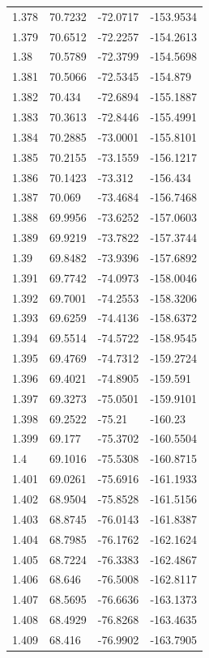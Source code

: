 \begin{tabular}{llll}
1.378 & 70.7232 & -72.0717 & -153.9534 \\
1.379 & 70.6512 & -72.2257 & -154.2613 \\
1.38 & 70.5789 & -72.3799 & -154.5698 \\
1.381 & 70.5066 & -72.5345 & -154.879 \\
1.382 & 70.434 & -72.6894 & -155.1887 \\
1.383 & 70.3613 & -72.8446 & -155.4991 \\
1.384 & 70.2885 & -73.0001 & -155.8101 \\
1.385 & 70.2155 & -73.1559 & -156.1217 \\
1.386 & 70.1423 & -73.312 & -156.434 \\
1.387 & 70.069 & -73.4684 & -156.7468 \\
1.388 & 69.9956 & -73.6252 & -157.0603 \\
1.389 & 69.9219 & -73.7822 & -157.3744 \\
1.39 & 69.8482 & -73.9396 & -157.6892 \\
1.391 & 69.7742 & -74.0973 & -158.0046 \\
1.392 & 69.7001 & -74.2553 & -158.3206 \\
1.393 & 69.6259 & -74.4136 & -158.6372 \\
1.394 & 69.5514 & -74.5722 & -158.9545 \\
1.395 & 69.4769 & -74.7312 & -159.2724 \\
1.396 & 69.4021 & -74.8905 & -159.591 \\
1.397 & 69.3273 & -75.0501 & -159.9101 \\
1.398 & 69.2522 & -75.21 & -160.23 \\
1.399 & 69.177 & -75.3702 & -160.5504 \\
1.4 & 69.1016 & -75.5308 & -160.8715 \\
1.401 & 69.0261 & -75.6916 & -161.1933 \\
1.402 & 68.9504 & -75.8528 & -161.5156 \\
1.403 & 68.8745 & -76.0143 & -161.8387 \\
1.404 & 68.7985 & -76.1762 & -162.1624 \\
1.405 & 68.7224 & -76.3383 & -162.4867 \\
1.406 & 68.646 & -76.5008 & -162.8117 \\
1.407 & 68.5695 & -76.6636 & -163.1373 \\
1.408 & 68.4929 & -76.8268 & -163.4635 \\
1.409 & 68.416 & -76.9902 & -163.7905 \\

\end{tabular}
